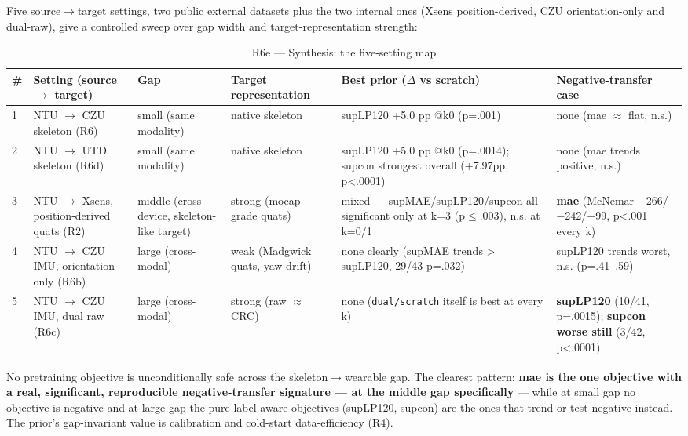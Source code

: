 Five source$\rightarrow$target settings, two public external datasets plus the two internal ones (Xsens position-derived, CZU orientation-only and dual-raw), give a controlled sweep over gap width and target-representation strength:

\begin{table}[!t]
\centering
\caption{R6e --- Synthesis: the five-setting map}
\small
\begin{tabular}{llllll}
\toprule
\# & Setting (source $\rightarrow$ target) & Gap & Target representation & Best prior ($\Delta$ vs scratch) & Negative-transfer case \\
\midrule
1 & NTU $\rightarrow$ CZU skeleton (R6) & small (same modality) & native skeleton & supLP120 +5.0 pp @k0 (p=.001) & none (mae $\approx$ flat, n.s.) \\
2 & NTU $\rightarrow$ UTD skeleton (R6d) & small (same modality) & native skeleton & supLP120 +5.0 pp @k0 (p=.0014); supcon strongest overall (+7.97pp, p<.0001) & none (mae trends positive, n.s.) \\
3 & NTU $\rightarrow$ Xsens, position-derived quats (R2) & middle (cross-device, skeleton-like target) & strong (mocap-grade quats) & mixed --- supMAE/supLP120/supcon all significant only at k=3 (p$\le$.003), n.s. at k=0/1 & \textbf{mae} (McNemar $-$266/$-$242/$-$99, p<.001 every k) \\
4 & NTU $\rightarrow$ CZU IMU, orientation-only (R6b) & large (cross-modal) & weak (Madgwick quats, yaw drift) & none clearly (supMAE trends > supLP120, 29/43 p=.032) & supLP120 trends worst, n.s. (p=.41--.59) \\
5 & NTU $\rightarrow$ CZU IMU, dual raw (R6c) & large (cross-modal) & strong (raw $\approx$ CRC) & none (\texttt{dual/scratch} itself is best at every k) & \textbf{supLP120} (10/41, p=.0015); \textbf{supcon worse still} (3/42, p<.0001) \\
\bottomrule
\end{tabular}
\end{table}

No pretraining objective is unconditionally safe across the skeleton$\rightarrow$wearable gap. The clearest pattern: \textbf{mae is the one objective with a real, significant, reproducible negative-transfer signature --- at the middle gap specifically} --- while at small gap no objective is negative and at large gap the pure-label-aware objectives (supLP120, supcon) are the ones that trend or test negative instead. The prior's gap-invariant value is calibration and cold-start data-efficiency (R4).

